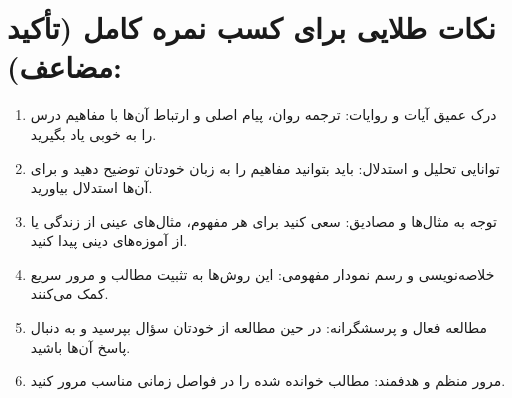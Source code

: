 \documentclass{article}
\begin{document}
\section*{نکات طلایی برای کسب نمره کامل (تأکید مضاعف):}

\begin{enumerate}
    \item درک عمیق آیات و روایات: ترجمه روان، پیام اصلی و ارتباط آن‌ها با مفاهیم درس را به خوبی یاد بگیرید.
    \item توانایی تحلیل و استدلال: باید بتوانید مفاهیم را به زبان خودتان توضیح دهید و برای آن‌ها استدلال بیاورید.
    \item توجه به مثال‌ها و مصادیق: سعی کنید برای هر مفهوم، مثال‌های عینی از زندگی یا از آموزه‌های دینی پیدا کنید.
    \item خلاصه‌نویسی و رسم نمودار مفهومی: این روش‌ها به تثبیت مطالب و مرور سریع کمک می‌کنند.
    \item مطالعه فعال و پرسشگرانه: در حین مطالعه از خودتان سؤال بپرسید و به دنبال پاسخ آن‌ها باشید.
    \item مرور منظم و هدفمند: مطالب خوانده شده را در فواصل زمانی مناسب مرور کنید.
\end{enumerate}
\end{document}
